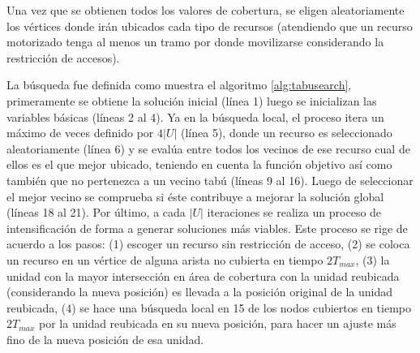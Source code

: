 Una vez que se obtienen todos los valores de cobertura, se eligen aleatoriamente los vértices donde irán ubicados cada tipo de recursos (atendiendo que un recurso motorizado tenga al menos un tramo por donde movilizarse considerando la restricción de accesos).



La búsqueda fue definida como muestra el algoritmo \ref{alg:tabusearch}, primeramente se obtiene la solución inicial (línea 1) luego se inicializan las variables básicas (líneas 2 al 4). Ya en la búsqueda local, el proceso itera un máximo de veces definido por $4|U|$ (línea 5), donde un recurso es seleccionado aleatoriamente (línea 6) y se evalúa entre todos los vecinos de ese recurso cual de ellos es el que mejor ubicado, teniendo en cuenta la función objetivo así como también que no pertenezca a un vecino tabú (líneas 9 al 16). Luego de seleccionar el mejor vecino se comprueba si éste contribuye a mejorar la solución global (líneas 18 al 21). Por último, a cada $|U|$ iteraciones se realiza un proceso de intensificación de forma a generar soluciones más viables. Este proceso se rige de acuerdo a los pasos: (1) escoger un recurso sin restricción de acceso, (2) se coloca un recurso en un vértice de alguna arista no cubierta en tiempo $2T_{max}$, (3) la unidad con la mayor intersección en área de cobertura con la unidad reubicada (considerando la nueva posición) es llevada a la posición original de la unidad reubicada, (4) se hace una búsqueda local en 15 de los nodos cubiertos en tiempo $2T_{max}$ por la unidad reubicada en su nueva posición, para hacer un ajuste más fino de la nueva posición de esa unidad.